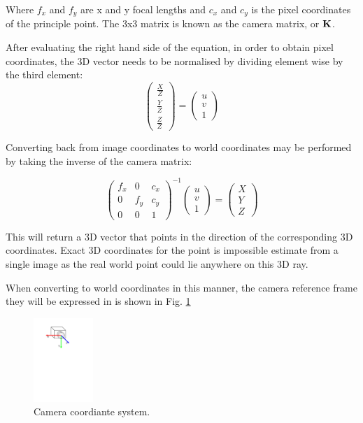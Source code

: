 Where $f_x$ and $f_y$ are x and y focal lengths and $c_x$ and $c_y$ is the pixel coordinates of the principle point.  The 3x3 matrix is known as the camera matrix, or $\mathbf K$.

After evaluating the right hand side of the equation, in order to obtain pixel coordinates, the 3D vector needs to be normalised by dividing element wise by the third element:
\begin{equation}
 \begin{pmatrix}
  \frac{X}{Z}  \\
  \frac{Y}{Z}  \\
  \frac{Z}{Z} 
 \end{pmatrix} =
 \begin{pmatrix}
  u \\ v \\ 1
 \end{pmatrix}
\end{equation}

Converting back from image coordinates to world coordinates may be performed by taking the inverse of the camera matrix:

\begin{equation}
 \begin{pmatrix}
  f_x & 0 & c_x \\
  0 & f_y & c_y \\
  0 & 0   & 1 
 \end{pmatrix}^{-1}
 \begin{pmatrix}
  u \\
  v \\
  1 
 \end{pmatrix} =
 \begin{pmatrix}
  X \\ Y \\ Z
 \end{pmatrix}
\end{equation}

This will return a 3D vector that points in the direction of the corresponding 3D coordinates.  Exact 3D coordinates for the point is impossible estimate from a single image as the real world point could lie anywhere on this 3D ray.

When converting to world coordinates in this manner, the camera reference frame they will be expressed in is shown in Fig. \ref{fig:cam_coord_sys}

\begin{figure}[h]
  \centering
    \includegraphics[width=0.2\textwidth]{chapters/images/cam_coord_sys}
  \caption{Camera coordiante system.}
 \label{fig:cam_coord_sys}
\end{figure}

